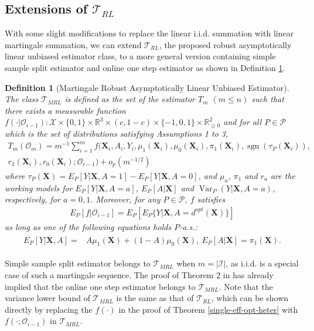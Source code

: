 \documentclass[11pt]{article}
\theoremstyle{referenceplain}
\theoremstyle{referencedefinition}
\newtheorem{definition}{Definition}
\theoremstyle{referenceremark}
\begin{document}
\subsection{Extensions of $\mathcal{T}_{RL}$}
With some slight modifications to replace the linear i.i.d. summation with linear martingale summation, we can extend $\mathcal{T}_{RL}$, the proposed robust asymptotically linear unbiased estimator class, to a more general version containing simple sample split estimator \citep{belloni2014inference,wager2018estimation} and online one step estimator \citep{luedtke2016statistical} as shown in Definition \ref{M-ralu}. 
\setcounter{definition}{1}
\begin{definition}[Martingale Robust Asymptotically Linear Unbiased Estimator]\label{M-ralu}
    The class $\mathcal{T}_{MRL}$ is defined as the set of the 
    estimator $T_m$ $(m\leq n)$ such that there exists a 
    measurable function 
    $f(\cdot|\mathcal{O}_{i-1}): \mathcal{X} \times\{0,1\} 
    \times \mathbb{R}^3 \times(c, 1-c) \times\{-1,0,1\} 
    \times \mathbb{R}_{\geq 0}^2$ and for all $P\in\mathcal{P}$ 
    which is the set of distributions satisfying 
    Assumptions 1 to 3,
    \begin{align*}
        T_m(\mathcal{O}_m)=m^{-1}\sum_{i=1}^m 
        f(\mathbf{X}_i,A_i,Y_i,\mu_1(\mathbf{X}_i),
        \mu_0(\mathbf{X}_i),\pi_1(\mathbf{X}_i),
        \operatorname{sgn}\left(\tau_P\left(\mathbf{X}_i
        \right)\right),\\
        r_1(\mathbf{X}_i),r_0(\mathbf{X}_i);
        \mathcal{O}_{i-1})+o_p(m^{-1/2})
    \end{align*}
    where $\tau_P(\mathbf{X})=E_P[Y|\mathbf{X},A=1]
    -E_P[Y|\mathbf{X},A=0]$, and $\mu_a$, $\pi_1$ and $r_a$ 
    are the working models for $E_P[Y|\mathbf{X},A=a]$, 
    $E_P[A|\mathbf{X}]$ and $\operatorname{Var}_P(Y|\mathbf{X},A=a)$, 
    respectively, for $a=0,1$. Moreover, for any 
    $P\in\mathcal{P}$, $f$ satisfies
    \begin{align}\label{M-unbias}
        E_P[f|\mathcal{O}_{i-1}] = 
        E_P[E_P\{Y|\mathbf{X},A=d^{opt}(\mathbf{X})\}]
    \end{align}
    as long as one of the following equations holds $P$-a.s.:
    \begin{align}\label{M-robust}
    \begin{aligned}
       E_P[Y|\mathbf{X},A] =& A \mu_1(\mathbf{X})
       +(1-A)\mu_0(\mathbf{X}),~
        E_P[A|\mathbf{X}]=\pi_1(\mathbf{X}).        
    \end{aligned}
    \end{align}
\end{definition}
Simple sample split estimator belongs to $\mathcal{T}_{MRL}$ when $m=|\mathcal{I}|$, as i.i.d. is a special case of such a martingale sequence. The proof of Theorem 2 in \citet{luedtke2016statistical} has already implied that the online one step estimator belongs to $\mathcal{T}_{MRL}$. Note that the variance lower bound of $\mathcal{T}_{MRL}$ is the same as that of $\mathcal{T}_{RL}$, which can be shown directly by replacing the $f(\cdot)$ in the proof of Theorem \ref{single-eff-opt-heter} with $f(\cdot;\mathcal{O}_{i-1})$ in $\mathcal{T}_{MRL}$.
\end{document}
